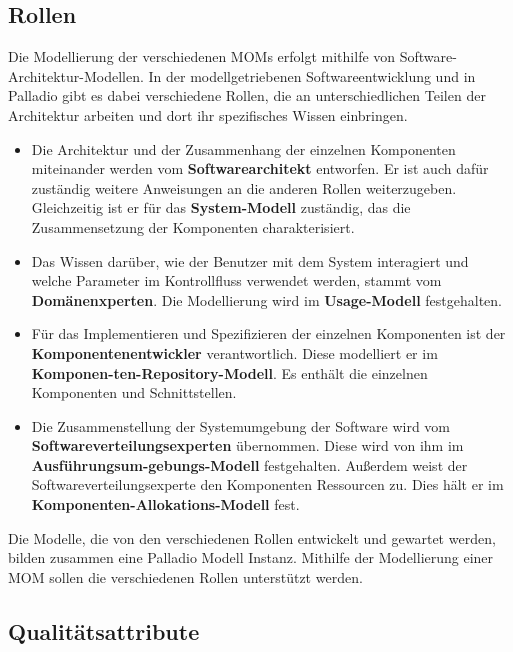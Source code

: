 \subsection{Rollen}
Die Modellierung der verschiedenen MOMs erfolgt mithilfe von Software-Architektur-Modellen. In der modellgetriebenen Softwareentwicklung und in Palladio gibt es dabei verschiedene Rollen, die an unterschiedlichen Teilen der Architektur arbeiten und dort ihr spezifisches Wissen einbringen.
\begin{itemize}
\item Die Architektur und der Zusammenhang der einzelnen Komponenten
miteinander werden vom \textbf{Softwarearchitekt} entworfen. Er ist auch dafür
zuständig weitere Anweisungen an die anderen Rollen weiterzugeben. Gleichzeitig ist er für das \textbf{System-Modell} zuständig, das die Zusammensetzung der Komponenten charakterisiert.
\item Das Wissen darüber, wie der Benutzer mit dem System interagiert
und welche Parameter im Kontrollfluss verwendet werden, stammt vom \textbf{Domänenxperten}. Die Modellierung wird im \textbf{Usage-Modell} festgehalten.
\item Für das Implementieren und Spezifizieren der einzelnen
Komponenten ist der \textbf{Komponentenentwickler} verantwortlich. Diese modelliert er im \textbf{Komponen-ten-Repository-Modell}. Es enthält die einzelnen Komponenten und Schnittstellen.
\item Die Zusammenstellung der Systemumgebung der Software wird vom \textbf{Softwareverteilungsexperten} übernommen. Diese wird von ihm im \textbf{Ausführungsum-gebungs-Modell} festgehalten. Außerdem weist der Softwareverteilungsexperte den Komponenten Ressourcen zu. Dies hält er im \textbf{Komponenten-Allokations-Modell} fest.
\end{itemize}
Die Modelle, die von den verschiedenen Rollen entwickelt und gewartet werden, bilden zusammen eine Palladio Modell Instanz. Mithilfe der Modellierung einer MOM sollen die verschiedenen Rollen unterstützt werden. 
\subsection{Qualitätsattribute}
